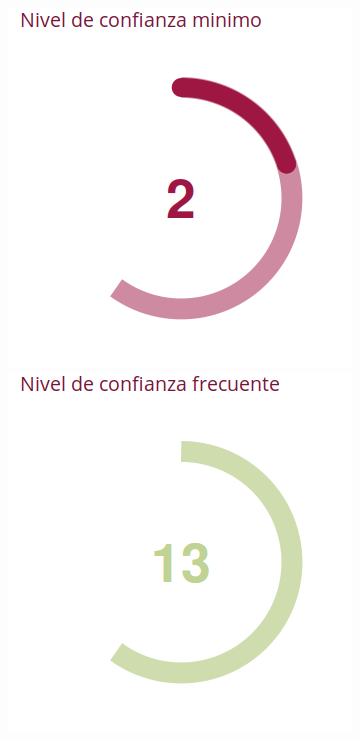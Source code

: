\documentclass[10,a4paperpaper,]{article}
\begin{document}
\begin{figure}[!htb]
  \begin{minipage}{0.3\textwidth}
  \centering
  \includegraphics[width=1.1\linewidth]{figures/nivelConfiMin.png}
  \end{minipage}\hfill
  \begin{minipage}{0.3\textwidth}
    \centering
    \includegraphics[width=1.1\linewidth]{figures/nivelConfiFrec.png}

\end{minipage}
\end{figure}
\end{document}
